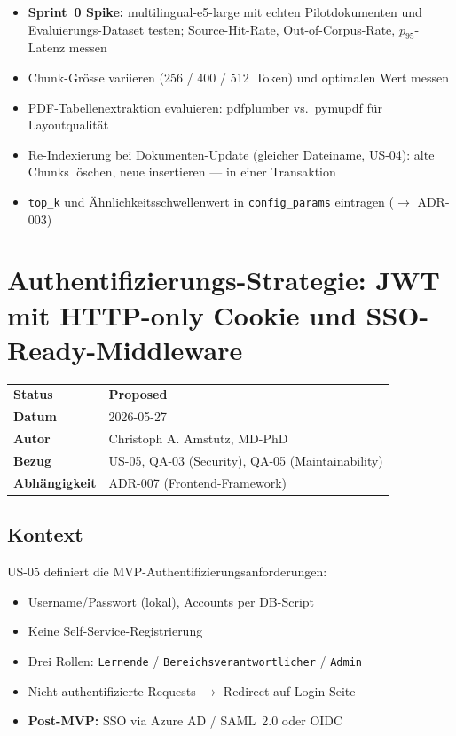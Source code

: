 \documentclass[a4paper, 11pt, oneside]{report}
\newcommand{\code}[1]{\texttt{\small #1}}
\newcommand{\ra}{$\rightarrow$\xspace}
\newcommand{\todo}{$\square$\;}
\newcommand{\statusProposed}{%
  \colorbox{statusproposed!28}{\small\bfseries\color{statusproposed!70!black}\;Proposed\;}}
\begin{document}
\begin{itemize}[label=\todo]
  \item \textbf{Sprint~0 Spike:} multilingual-e5-large mit echten Pilotdokumenten
        und Evaluierungs-Dataset testen; Source-Hit-Rate, Out-of-Corpus-Rate,
        $p_{95}$-Latenz messen
  \item Chunk-Grösse variieren (256 / 400 / 512~Token) und optimalen Wert messen
  \item PDF-Tabellenextraktion evaluieren: pdfplumber vs.\ pymupdf für Layoutqualität
  \item Re-Indexierung bei Dokumenten-Update (gleicher Dateiname, US-04):
        alte Chunks löschen, neue insertieren --- in einer Transaktion
  \item \code{top\_k} und Ähnlichkeitsschwellenwert in \code{config\_params}
        eintragen (\ra ADR-003)
\end{itemize}

\chapter{Authentifizierungs-Strategie: JWT mit HTTP-only Cookie und SSO-Ready-Middleware}
\label{chap:adr006}

\begin{tcolorbox}[enhanced, colback=adrlightblue, colframe=adrblue,
  boxrule=0.9pt, arc=3pt, left=8pt, right=8pt, top=6pt, bottom=6pt]
\begin{tabular}{@{}L{3.2cm}L{11.5cm}@{}}
\textbf{Status}      & \statusProposed \\[3pt]
\textbf{Datum}       & 2026-05-27 \\[3pt]
\textbf{Autor}       & Christoph A. Amstutz, MD-PhD \\[3pt]
\textbf{Bezug}       & US-05, QA-03 (Security), QA-05 (Maintainability) \\[3pt]
\textbf{Abhängigkeit}& ADR-007 (Frontend-Framework) \\
\end{tabular}
\end{tcolorbox}

\section{Kontext}

US-05 definiert die MVP-Authentifizierungsanforderungen:
\begin{itemize}
  \item Username/Passwort (lokal), Accounts per DB-Script
  \item Keine Self-Service-Registrierung
  \item Drei Rollen: \code{Lernende} / \code{Bereichsverantwortlicher} / \code{Admin}
  \item Nicht authentifizierte Requests \ra Redirect auf Login-Seite
  \item \textbf{Post-MVP:} SSO via Azure AD / SAML~2.0 oder OIDC
\end{itemize}
\end{document}
